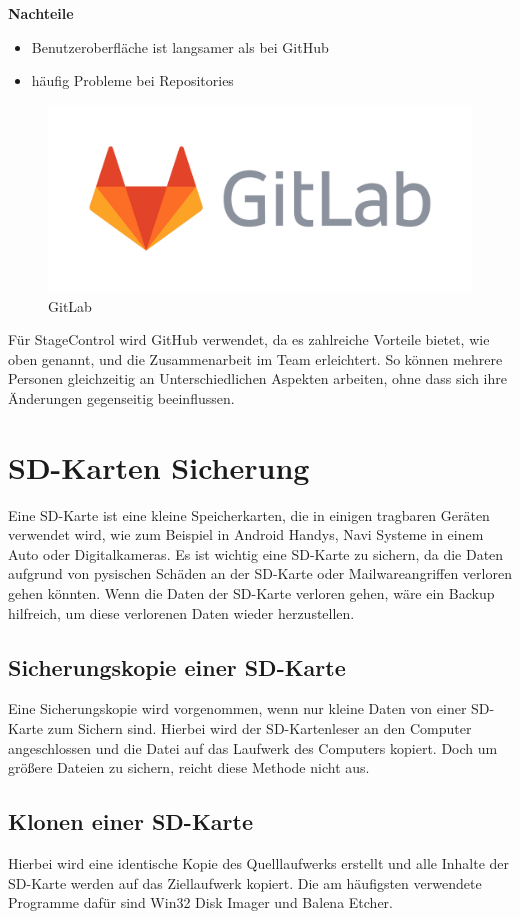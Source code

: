\textbf{Nachteile}
\begin{itemize}
	\item Benutzeroberfläche ist langsamer als bei GitHub
	\item häufig Probleme bei Repositories 
\end{itemize}


\begin{figure}[H]
	\centering
	\includegraphics[width=0.5\linewidth]{images/GitLab.png}
	\caption[GitLab]{GitLab}
	\label{fig:GitLab}
\end{figure}

Für StageControl wird GitHub verwendet, da es zahlreiche Vorteile bietet, wie oben genannt, und die Zusammenarbeit im Team erleichtert. So können mehrere Personen gleichzeitig an Unterschiedlichen Aspekten arbeiten, ohne dass sich ihre Änderungen gegenseitig beeinflussen.

\section{SD-Karten Sicherung}
Eine SD-Karte ist eine kleine Speicherkarten, die in einigen tragbaren Geräten verwendet wird, wie zum Beispiel in Android Handys, Navi Systeme in einem Auto oder Digitalkameras. Es ist wichtig eine SD-Karte zu sichern, da die Daten aufgrund von pysischen Schäden an der SD-Karte oder Mailwareangriffen verloren gehen könnten. Wenn die Daten der SD-Karte verloren gehen, wäre ein Backup hilfreich, um diese verlorenen Daten wieder herzustellen.  \parencite{SD-KartenSicherung}

\subsection{Sicherungskopie einer SD-Karte}
Eine Sicherungskopie wird vorgenommen, wenn nur kleine Daten von einer SD-Karte zum Sichern sind. Hierbei wird der SD-Kartenleser an den Computer angeschlossen und die Datei auf das Laufwerk des Computers kopiert. Doch um größere Dateien zu sichern, reicht diese Methode nicht aus. \parencite{SD-KartenSicherung}

\subsection{Klonen einer SD-Karte}
Hierbei wird eine identische Kopie des Quelllaufwerks erstellt und alle Inhalte der SD-Karte werden auf das Ziellaufwerk kopiert. Die am häufigsten verwendete Programme dafür sind Win32 Disk Imager und Balena Etcher. \parencite{SD-KartenSicherung}

